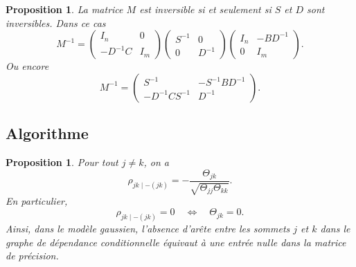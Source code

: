 \documentclass[10pt]{article}
\newtheorem{prop}[thm]{Proposition}
\begin{document}
\begin{prop}
	La matrice $M$ est inversible si et seulement si $S$ et $D$ sont inversibles.
	Dans ce cas
	\[
		M^{-1} =
		\begin{pmatrix}
			I_n       & 0   \\
			-D^{-1} C & I_m
		\end{pmatrix}
		\begin{pmatrix}
			S^{-1} & 0      \\
			0      & D^{-1}
		\end{pmatrix}
		\begin{pmatrix}
			I_n & -BD^{-1} \\
			0   & I_m
		\end{pmatrix}.
	\]
	Ou encore
	\[
		M^{-1} =
		\begin{pmatrix}
			S^{-1}           & -S^{-1}BD^{-1} \\
			-D^{-1} C S^{-1} & D^{-1}
		\end{pmatrix}.
	\]
\end{prop}

\subsection{Algorithme}

\begin{prop}
	Pour tout $j\neq k$, on a
	\[
		\rho_{jk\mid -(jk)}
		=
		-\frac{\Theta_{jk}}{\sqrt{\Theta_{jj}\Theta_{kk}}}.
	\]
	En particulier,
	\[
		\rho_{jk\mid -(jk)}=0
		\quad \Longleftrightarrow \quad
		\Theta_{jk}=0.
	\]
	Ainsi, dans le modèle gaussien, l'absence d'arête entre les sommets $j$ et $k$ dans le graphe de dépendance conditionnelle équivaut à une entrée nulle dans la matrice de précision.
\end{prop}
\end{document}
